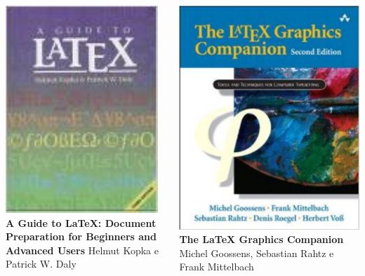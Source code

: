 \begin{frame}
\begin{columns}
	 \includegraphics[scale=.3]{../img/livro3.pdf} \textbf{A Guide to LaTeX: Document Preparation for
Beginners and Advanced Users} Helmut Kopka e Patrick W. Daly 

\includegraphics[scale=.15]{../img/livro4.pdf} \textbf{The LaTeX Graphics Companion} Michel Goossens,
Sebastian Rahtz e Frank Mittelbach
\end{columns}
 
\end{frame} 



